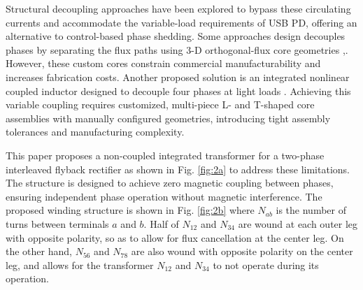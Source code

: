 \documentclass[lettersize,journal]{IEEEtran}
\begin{document}
Structural decoupling approaches have been explored to bypass these circulating currents and accommodate the variable-load requirements of USB PD, offering an alternative to control-based phase shedding. {\color{red}Some approaches design decouples phases by separating the flux paths using  3-D orthogonal-flux core geometries \cite{Ouyang},\color{red}\cite{fayyaz2025}}. However, these custom cores constrain commercial manufacturability and increases fabrication costs. Another proposed solution is an integrated nonlinear coupled inductor designed to decouple four phases at light loads \cite{Z_Li_2025}. Achieving this variable coupling requires customized, multi-piece L- and T-shaped core assemblies with manually configured geometries, introducing tight assembly tolerances and manufacturing complexity.


This paper proposes a non-coupled integrated transformer for a two-phase interleaved flyback rectifier as shown in Fig. \ref{fig:2a} to address these limitations. The structure is designed to achieve zero magnetic coupling between phases, ensuring independent phase operation without magnetic interference. The proposed winding structure is shown in Fig. \ref{fig:2b} where $N_{ab}$ is the number of turns between terminals $a$ and $b$. Half of $N_{12}$ and $N_{34}$ are wound at each outer leg with opposite polarity, so as to allow for flux cancellation at the center leg. On the other hand, $N_{56}$ and $N_{78}$ are also wound with opposite polarity on the center leg, and allows for the transformer $N_{12}$ and $N_{34}$ to not operate during its operation. 
\end{document}
